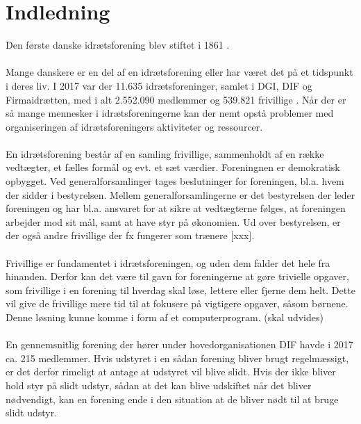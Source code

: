 \chapter{Indledning}\label{ch:introduction}
Den første danske idrætsforening blev stiftet i 1861 \cite{difhistorie}.
\\
\\
Mange danskere er en del af en idrætsforening eller har været det på et tidspunkt i deres liv. I 2017 var der 11.635 idrætsforeninger, samlet i DGI, DIF og Firmaidrætten, med i alt 2.552.090 medlemmer og 539.821 frivillige \cite{fester2018}. Når der er så mange mennesker i idrætsforeningerne kan der nemt opstå problemer med organiseringen af idrætsforeningers aktiviteter og ressourcer. 
\\
\\
En idrætsforening består af en samling frivillige, sammenholdt af en række vedtægter, et fælles formål og evt. et sæt værdier. Foreningnen er demokratisk opbygget. Ved generalforsamlinger tages beslutninger for foreningen, bl.a. hvem der sidder i bestyrelsen. Mellem generalforsamlingerne er det bestyrelsen der leder foreningen og har bl.a. ansvaret for at sikre at vedtægterne følges, at foreningen arbejder mod sit mål, samt at have styr på økonomien. Ud over bestyrelsen, er der også andre frivillige der fx fungerer som trænere [xxx].
\\
\\
Frivillige er fundamentet i idrætsforeningen, og uden dem falder det hele fra hinanden. Derfor kan det være til gavn for foreningerne at gøre trivielle opgaver, som frivillige i en forening til hverdag skal løse, lettere eller fjerne dem helt. Dette vil give de frivillige mere tid til at fokusere på vigtigere opgaver, såsom børnene.
Denne løsning kunne komme i form af et computerprogram. (skal udvides)
\\
\\
En gennemsnitlig forening der hører under hovedorganisationen DIF havde i 2017 ca. 215 medlemmer. Hvis udstyret i en sådan forening bliver brugt regelmæssigt, er det derfor rimeligt at antage at udstyret vil blive slidt. \citep{idrætTal2017}
Hvis der ikke bliver hold styr på slidt udstyr, sådan at det kan blive udskiftet når det bliver nødvendigt, kan en forening ende i den situation at de bliver nødt til at bruge slidt udstyr.
